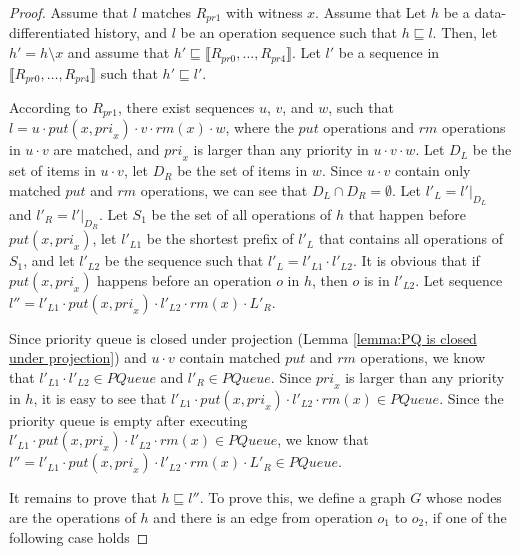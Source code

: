 \documentclass{llncs}
\begin{document}
\begin {proof}

Assume that $l$ matches $R_{\textit{pr1}}$ with witness $x$. Assume that  Let $h$ be a data-differentiated history, and $l$ be an operation sequence such that $h \sqsubseteq l$. Then, let $h'=h \setminus x$ and assume that $h' \sqsubseteq \llbracket R_{\textit{pr0}},\ldots,R_{\textit{pr4}} \rrbracket$. Let $l'$ be a sequence in $\llbracket R_{\textit{pr0}},\ldots,R_{\textit{pr4}} \rrbracket$ such that $h' \sqsubseteq l'$.

According to $R_{\textit{pr1}}$, there exist sequences $u$, $v$, and $w$, such that $l=u \cdot \textit{put}(x,\textit{pri}_x) \cdot v \cdot \textit{rm}(x) \cdot w$, where the $\textit{put}$ operations and $\textit{rm}$ operations in $u \cdot v$ are matched, and $\textit{pri}_x$ is larger than any priority in $u \cdot v \cdot w$. Let $D_L$ be the set of items in $u \cdot v$, let $D_R$ be the set of items in $w$. Since $u \cdot v$ contain only matched $\textit{put}$ and $\textit{rm}$ operations, we can see that $D_L \cap D_R = \emptyset$. Let $l'_L = l' \vert_{D_L}$ and $l'_R = l' \vert_{D_R}$. Let $S_1$ be the set of all operations of $h$ that happen before $\textit{put}(x,\textit{pri}_x)$, let $l'_{L1}$ be the shortest prefix of $l'_L$ that contains all operations of $S_1$, and let $l'_{L2}$ be the sequence such that $l'_L = l'_{L1} \cdot l'_{L2}$. It is obvious that if $\textit{put}(x,\textit{pri}_x)$ happens before an operation $o$ in $h$, then $o$ is in $l'_{L2}$. Let sequence $l'' = l'_{L1} \cdot \textit{put}(x,\textit{pri}_x) \cdot l'_{L2} \cdot \textit{rm}(x) \cdot L'_R$.

Since priority queue is closed under projection (Lemma \ref{lemma:PQ is closed under projection}) and $u \cdot v$ contain matched $\textit{put}$ and $\textit{rm}$ operations, we know that $l'_{L1} \cdot l'_{L2} \in \textit{PQueue}$ and $l'_R \in \textit{PQueue}$. Since $\textit{pri}_x$ is larger than any priority in $h$, it is easy to see that $l'_{L1} \cdot \textit{put}(x,\textit{pri}_x) \cdot l'_{L2} \cdot \textit{rm}(x) \in \textit{PQueue}$. Since the priority queue is empty after executing $l'_{L1} \cdot \textit{put}(x,\textit{pri}_x) \cdot l'_{L2} \cdot \textit{rm}(x) \in \textit{PQueue}$, we know that $l'' = l'_{L1} \cdot \textit{put}(x,\textit{pri}_x) \cdot l'_{L2} \cdot \textit{rm}(x) \cdot L'_R \in \textit{PQueue}$.

It remains to prove that $h \sqsubseteq l''$. To prove this, we define a graph $G$ whose nodes are the operations of $h$ and there is an edge from operation $o_1$ to $o_2$, if one of the following case holds


\end{proof}
\end{document}
